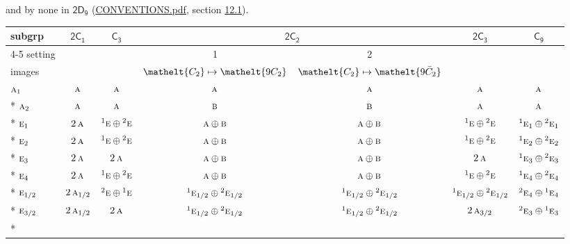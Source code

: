 \documentclass[10pt,a4paper]{article}
\numberwithin{equation}{section}
\newcommand{\eltfont}[1]{{\let\sigma\eltsigma\mathelt{#1}}}
\newcommand{\grp}[1]{\mathsf{#1}}
\newcommand{\irr}[1]{\text{\normalfont\scshape #1}}
\newcommand{\conjpair}[1]{{}^{#1}}
\newcommand{\cls}[1]{\eltfont{#1}}
\newcommand{\barred}[1]{\bar{#1}}
\begin{document}
and by none in $\grp{2D_{9}}$ (\href{../../CONVENTIONS.pdf}{CONVENTIONS.pdf}, section \href{../../../rotation/CONVENTIONS.pdf\#conv.12.1}{12.1}).
{\small\begin{longtable}{@{}lcccccc@{}}\toprule
subgrp & \href{2C1.pdf}{$\grp{2C_{1}}$} & \href{C3.pdf}{$\grp{C_{3}}$} & \multicolumn{2}{c}{\href{2C2.pdf}{$\grp{2C_{2}}$}} & \href{2C3.pdf}{$\grp{2C_{3}}$} & \href{C9.pdf}{$\grp{C_{9}}$}\\\cmidrule(lr){4-5}
setting &  &  & 1 & 2 &  & \\
images &  &  & {\scriptsize $\cls{C_{2}} \mapsto \cls{9C_{2}}$} & {\scriptsize $\cls{C_{2}} \mapsto \cls{9\barred{C}_{2}}$} &  & \\\midrule\endhead
\bottomrule\endfoot\endlastfoot
$\irr{a}_{1}$ & $\irr{a}$ & $\irr{a}$ & $\irr{a}$ & $\irr{a}$ & $\irr{a}$ & $\irr{a}$\\*
$\irr{a}_{2}$ & $\irr{a}$ & $\irr{a}$ & $\irr{b}$ & $\irr{b}$ & $\irr{a}$ & $\irr{a}$\\*
$\irr{e}_{1}$ & $2\,\irr{a}$ & $\conjpair{1}\irr{e}\oplus \conjpair{2}\irr{e}$ & $\irr{a}\oplus \irr{b}$ & $\irr{a}\oplus \irr{b}$ & $\conjpair{1}\irr{e}\oplus \conjpair{2}\irr{e}$ & $\conjpair{1}\irr{e}_{1}\oplus \conjpair{2}\irr{e}_{1}$\\*
$\irr{e}_{2}$ & $2\,\irr{a}$ & $\conjpair{1}\irr{e}\oplus \conjpair{2}\irr{e}$ & $\irr{a}\oplus \irr{b}$ & $\irr{a}\oplus \irr{b}$ & $\conjpair{1}\irr{e}\oplus \conjpair{2}\irr{e}$ & $\conjpair{1}\irr{e}_{2}\oplus \conjpair{2}\irr{e}_{2}$\\*
$\irr{e}_{3}$ & $2\,\irr{a}$ & $2\,\irr{a}$ & $\irr{a}\oplus \irr{b}$ & $\irr{a}\oplus \irr{b}$ & $2\,\irr{a}$ & $\conjpair{1}\irr{e}_{3}\oplus \conjpair{2}\irr{e}_{3}$\\*
$\irr{e}_{4}$ & $2\,\irr{a}$ & $\conjpair{1}\irr{e}\oplus \conjpair{2}\irr{e}$ & $\irr{a}\oplus \irr{b}$ & $\irr{a}\oplus \irr{b}$ & $\conjpair{1}\irr{e}\oplus \conjpair{2}\irr{e}$ & $\conjpair{1}\irr{e}_{4}\oplus \conjpair{2}\irr{e}_{4}$\\*
$\irr{e}_{1/2}$ & $2\,\irr{a}_{1/2}$ & $\conjpair{2}\irr{e}\oplus \conjpair{1}\irr{e}$ & $\conjpair{1}\irr{e}_{1/2}\oplus \conjpair{2}\irr{e}_{1/2}$ & $\conjpair{1}\irr{e}_{1/2}\oplus \conjpair{2}\irr{e}_{1/2}$ & $\conjpair{1}\irr{e}_{1/2}\oplus \conjpair{2}\irr{e}_{1/2}$ & $\conjpair{2}\irr{e}_{4}\oplus \conjpair{1}\irr{e}_{4}$\\*
$\irr{e}_{3/2}$ & $2\,\irr{a}_{1/2}$ & $2\,\irr{a}$ & $\conjpair{1}\irr{e}_{1/2}\oplus \conjpair{2}\irr{e}_{1/2}$ & $\conjpair{1}\irr{e}_{1/2}\oplus \conjpair{2}\irr{e}_{1/2}$ & $2\,\irr{a}_{3/2}$ & $\conjpair{2}\irr{e}_{3}\oplus \conjpair{1}\irr{e}_{3}$\\*

\end{longtable}}
\end{document}
